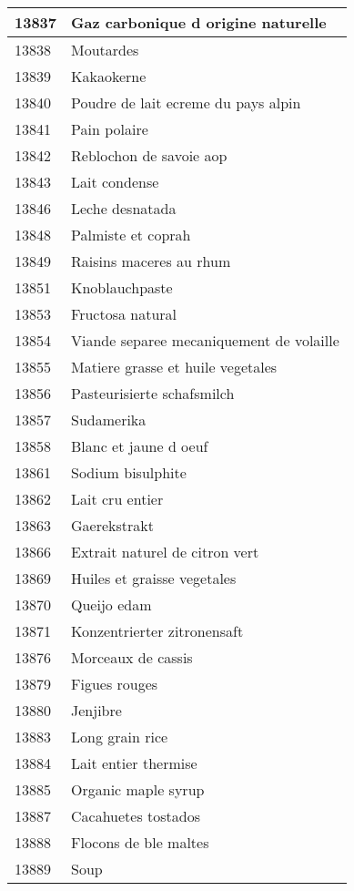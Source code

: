 \begin{longtable}{|l|l|}
13837 & Gaz carbonique d origine naturelle \\ \hline 
13838 & Moutardes \\ \hline 
13839 & Kakaokerne \\ \hline 
13840 & Poudre de lait ecreme du pays alpin \\ \hline 
13841 & Pain polaire \\ \hline 
13842 & Reblochon de savoie aop \\ \hline 
13843 & Lait condense \\ \hline 
13846 & Leche desnatada \\ \hline 
13848 & Palmiste et coprah \\ \hline 
13849 & Raisins maceres au rhum \\ \hline 
13851 & Knoblauchpaste \\ \hline 
13853 & Fructosa natural \\ \hline 
13854 & Viande separee mecaniquement de volaille \\ \hline 
13855 & Matiere grasse et huile vegetales \\ \hline 
13856 & Pasteurisierte schafsmilch \\ \hline 
13857 & Sudamerika \\ \hline 
13858 & Blanc et jaune d oeuf \\ \hline 
13861 & Sodium bisulphite \\ \hline 
13862 & Lait cru entier \\ \hline 
13863 & Gaerekstrakt \\ \hline 
13866 & Extrait naturel de citron vert \\ \hline 
13869 & Huiles et graisse vegetales \\ \hline 
13870 & Queijo edam \\ \hline 
13871 & Konzentrierter zitronensaft \\ \hline 
13876 & Morceaux de cassis \\ \hline 
13879 & Figues rouges \\ \hline 
13880 & Jenjibre \\ \hline 
13883 & Long grain rice \\ \hline 
13884 & Lait entier thermise \\ \hline 
13885 & Organic maple syrup \\ \hline 
13887 & Cacahuetes tostados \\ \hline 
13888 & Flocons de ble maltes \\ \hline 
13889 & Soup \\ \hline 

\end{longtable}
